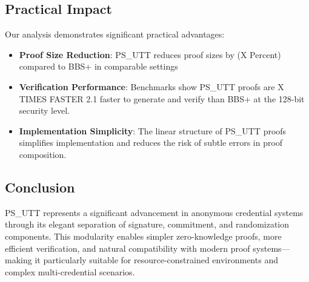\subsection{Practical Impact}
Our analysis demonstrates significant practical advantages:


\begin{itemize}
   \item \textbf{Proof Size Reduction}: PS\_UTT reduces proof sizes by (X Percent)  compared to BBS+ in comparable settings
   
   \item \textbf{Verification Performance}: Benchmarks show PS\_UTT proofs are X TIMES FASTER 2.1 faster to generate and verify than BBS+ at the 128-bit security level.
   
   \item \textbf{Implementation Simplicity}: The linear structure of PS\_UTT proofs simplifies implementation and reduces the risk of subtle errors in proof composition.
\end{itemize}

\subsection{Conclusion}
PS\_UTT represents a significant advancement in anonymous credential systems through its elegant separation of signature, commitment, and randomization components. This modularity enables simpler zero-knowledge proofs, more efficient verification, and natural compatibility with modern proof systems—making it particularly suitable for resource-constrained environments and complex multi-credential scenarios.











% 
% 




